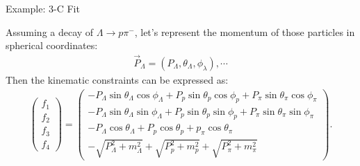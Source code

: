 \documentclass[
	xcolor=dvipsnames,
	10pt, 
	]{beamer}
\begin{document}
\begin{frame}{Example: 3-C Fit }
	\begin{block}{}
		Assuming a decay of $\Lambda\to p\pi^-$, let's represent the momentum of those particles in spherical coordinates:
		\begin{align}
			\vec{P}_\Lambda = (P_\Lambda,\theta_\Lambda,\phi_\lambda),\cdots
		\end{align}
		Then the kinematic constraints can be expressed as:
		\begin{align}
			\begin{pmatrix}
				f_1\\f_2\\f_3\\f_4
			\end{pmatrix}=
			\begin{pmatrix}
			-P_\Lambda\sin\theta_\Lambda\cos\phi_\Lambda+P_p\sin\theta_p\cos\phi_p+P_\pi\sin\theta_\pi\cos\phi_\pi\\
			-P_\Lambda\sin\theta_\Lambda\sin\phi_\Lambda+P_p\sin\theta_p\sin\phi_p+P_\pi\sin\theta_\pi\sin\phi_\pi\\
			-P_\Lambda\cos\theta_\Lambda+P_p\cos\theta_p+p_\pi\cos\theta_\pi\\
			-\sqrt{P_\Lambda^2+m_\Lambda^2}+\sqrt{P_p^2+m_p^2}+\sqrt{P_\pi^2+m_\pi^2}
			\end{pmatrix}.\label{FMat}
		\end{align}
	\end{block}
\end{frame}
\end{document}
